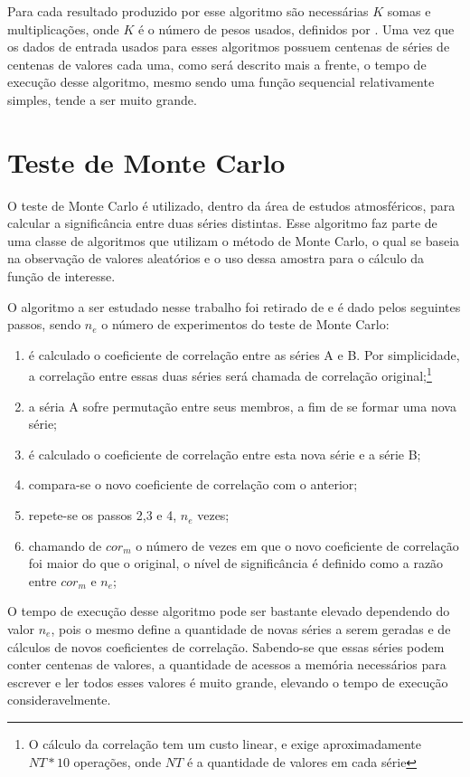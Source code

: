 Para cada resultado produzido por esse algoritmo são necessárias $K$ somas e multiplicações, onde $K$ é o número de pesos usados, definidos por \cite{Duchon:1979}. Uma vez que os dados de entrada usados para esses algoritmos possuem centenas de séries de centenas de valores cada uma, como será descrito mais a frente, o tempo de execução desse algoritmo, mesmo sendo uma função sequencial relativamente simples, tende a ser muito grande.

\section{Teste de Monte Carlo}

O teste de Monte Carlo é utilizado, dentro da área de estudos atmosféricos, para calcular a significância entre duas séries distintas. Esse algoritmo faz parte de uma classe de algoritmos que utilizam o método de Monte Carlo, o qual se baseia na observação de valores aleatórios e o uso dessa amostra para o cálculo da função de interesse.

O algoritmo a ser estudado nesse trabalho foi retirado de \cite{Joao:2010} e é dado pelos seguintes passos, sendo $n_{e}$ o número de experimentos do teste de Monte Carlo:

\begin{enumerate}
\item  é calculado o coeficiente de correlação entre as séries A e B. Por simplicidade, a correlação entre essas duas séries será chamada de correlação original;\footnote{O cálculo da correlação tem um custo linear, e exige aproximadamente $NT*10$ operações, onde $NT$ é a quantidade de valores em cada série}

\item  a séria A sofre permutação entre seus membros, a fim de se formar uma nova série;

\item  é calculado o coeficiente de correlação entre esta nova série e a série B;

\item  compara-se o novo coeficiente de correlação com o anterior;

\item  repete-se os passos 2,3 e 4, $n_{e}$ vezes;

\item  chamando de $cor_{m}$ o número de vezes em que o novo coeficiente de correlação foi maior do que o original, o nível de significância é definido como a razão entre $cor_{m}$ e $n_{e}$;
\end{enumerate}

O tempo de execução desse algoritmo pode ser bastante elevado dependendo do valor $n_{e}$, pois o mesmo define a quantidade de novas séries a serem geradas e de cálculos de novos coeficientes de correlação. Sabendo-se que essas séries podem conter centenas de valores, a quantidade de acessos a memória necessários para escrever e ler todos esses valores é muito grande, elevando o tempo de execução consideravelmente.